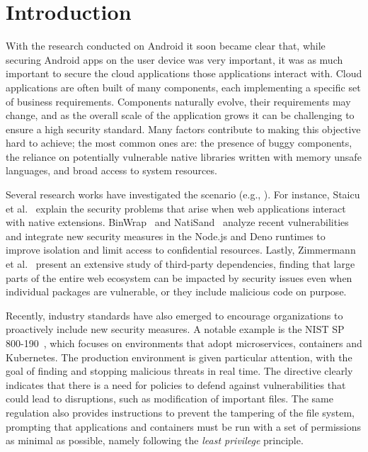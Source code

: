 \section{Introduction}
\label{dmng:sect:introduction}

With the research conducted on Android it soon became clear that,
while securing Android apps on the user device was very important,
it was as much important to secure the cloud applications those
applications interact with.
Cloud applications are often built of many components, each
implementing a specific set of business requirements. Components
naturally evolve, their requirements may change, and as the overall scale
of the application grows it can be challenging to ensure a high
security standard. Many factors contribute to making this objective
hard to achieve; the most common ones are: the presence of buggy
components, the reliance on potentially vulnerable native libraries
written with memory unsafe languages, and broad access to system
resources.

Several research works have investigated the scenario (e.g.,
\cite{staicu2021bilingual, binwrap,natisand, zimmermann-risks}). For
instance, Staicu et al.~\cite{staicu2021bilingual} explain the
security problems that arise when web applications interact with
native extensions. BinWrap~\cite{binwrap} and NatiSand~\cite{natisand}
analyze recent vulnerabilities and integrate new security
measures in the Node.js and Deno runtimes to improve isolation and
limit access to confidential resources. Lastly, 
Zimmermann et al.~\cite{zimmermann-risks} present an extensive study of third-party
dependencies, finding that large parts of the entire web ecosystem can
be impacted by security issues even when individual packages are
vulnerable, or they include malicious code on purpose.

Recently, industry standards have also emerged to encourage
organizations to proactively include new security measures. A notable
example is the NIST SP 800-190~\cite{nist-sp800-190}, which focuses on
environments that adopt microservices, containers and Kubernetes. The
production environment is given particular attention, with the goal of
finding and stopping malicious threats in real time.  The directive
clearly indicates that there is a need for policies to defend against
vulnerabilities that could lead to disruptions, such as modification
of important files. The same regulation also provides instructions to
prevent the tampering of the file system, prompting that applications
and containers must be run with a set of permissions as minimal as
possible, namely following the {\em least privilege} principle.

